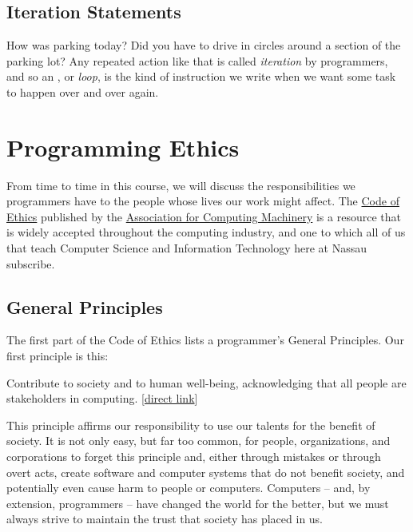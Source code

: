 \subsection{Iteration Statements}

How was parking today?  Did you have to drive in circles around a section of the parking lot?  Any repeated action like that is called \textit{iteration} by programmers, and so an , or \textit{loop}, is the kind of instruction we write when we want some task to happen over and over again.

\section{Programming Ethics}

From time to time in this course, we will discuss the responsibilities we programmers have to the people whose lives our work might affect.  The \href{https://www.acm.org/code-of-ethics}{Code of Ethics} published by the \href{https://www.acm.org/}{Association for Computing Machinery} is a resource that is widely accepted throughout the computing industry, and one to which all of us that teach Computer Science and Information Technology here at Nassau subscribe.

\subsection{General Principles}

The first part of the Code of Ethics lists a programmer's General Principles.  Our first principle is this:

\begin{tcolorbox}[width=\textwidth,colback=black!10]
Contribute to society and to human well-being, acknowledging that all people are stakeholders in computing.  [\href{https://www.acm.org/code-of-ethics#h-1.1-contribute-to-society-and-to-human-well-being,-acknowledging-that-all-people-are-stakeholders-in-computing.}{direct link}]
\end{tcolorbox}

This principle affirms our responsibility to use our talents for the benefit of society.  It is not only easy, but far too common, for people, organizations, and corporations to forget this principle and, either through mistakes or through overt acts, create software and computer systems that do not benefit society, and potentially even cause harm to people or computers.  Computers -- and, by extension, programmers -- have changed the world for the better, but we must always strive to maintain the trust that society has placed in us.

